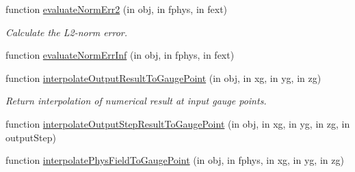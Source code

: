 \begin{DoxyCompactItemize}
function \hyperlink{class_ndg_post_process_af9e2ccaedeb209aa53697adadc08451b}{evaluate\+Norm\+Err2} (in obj, in fphys, in fext)
\begin{DoxyCompactList}\small\item\em Calculate the L2-\/norm error. \end{DoxyCompactList}\item 
function \hyperlink{class_ndg_post_process_ae1a351e3d66f138149ca586160fa77df}{evaluate\+Norm\+Err\+Inf} (in obj, in fphys, in fext)
\item 
function \hyperlink{class_ndg_post_process_ac368557b19daf792366b0328d801a974}{interpolate\+Output\+Result\+To\+Gauge\+Point} (in obj, in xg, in yg, in zg)
\begin{DoxyCompactList}\small\item\em Return interpolation of numerical result at input gauge points. \end{DoxyCompactList}\item 
function \hyperlink{class_ndg_post_process_a4591e1692fed63238d7d4ac291e1018c}{interpolate\+Output\+Step\+Result\+To\+Gauge\+Point} (in obj, in xg, in yg, in zg, in output\+Step)
\item 
function \hyperlink{class_ndg_post_process_a9e40a19774380b19b62903285bb40544}{interpolate\+Phys\+Field\+To\+Gauge\+Point} (in obj, in fphys, in xg, in yg, in zg)
\end{DoxyCompactItemize}
